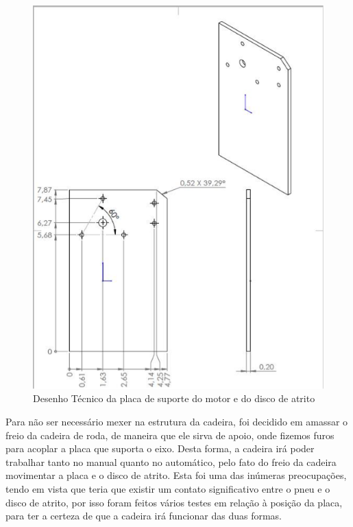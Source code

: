 \begin{figure}
    \begin{center}
        \includegraphics{figuras/support_plate.png}
    \end{center}
    \caption{Desenho Técnico da placa de suporte do motor e do disco de atrito}
    \label{fig:support_plate}
\end{figure}

Para não ser necessário mexer na estrutura da cadeira, foi decidido em amassar
o freio da cadeira de roda, de maneira que ele sirva de apoio, onde fizemos
furos para acoplar a placa que suporta o eixo. Desta forma, a cadeira irá poder
trabalhar tanto no manual quanto no automático, pelo fato do freio da cadeira
movimentar a placa e o disco de atrito. Esta foi uma das inúmeras preocupações,
tendo em vista que teria que existir um contato significativo entre o pneu e o
disco de atrito, por isso foram feitos vários testes em relação à posição da
placa, para ter a certeza de que a cadeira irá funcionar das duas formas.


